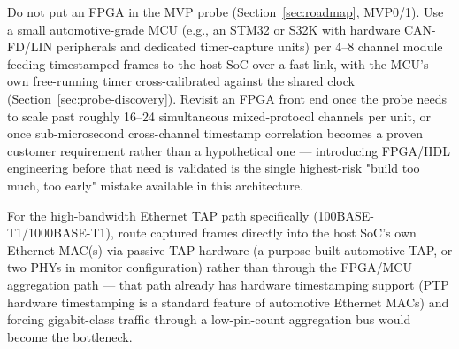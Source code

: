 \begin{decision}[title={FPGA recommendation}]
Do not put an FPGA in the MVP probe (Section~\ref{sec:roadmap}, MVP0/1). Use a small automotive-grade MCU (e.g., an STM32 or S32K with hardware CAN-FD/LIN peripherals and dedicated timer-capture units) per 4--8 channel module feeding timestamped frames to the host SoC over a fast link, with the MCU's own free-running timer cross-calibrated against the shared clock (Section~\ref{sec:probe-discovery}). Revisit an FPGA front end once the probe needs to scale past roughly 16--24 simultaneous mixed-protocol channels per unit, or once sub-microsecond cross-channel timestamp correlation becomes a proven customer requirement rather than a hypothetical one --- introducing FPGA/HDL engineering before that need is validated is the single highest-risk "build too much, too early" mistake available in this architecture.
\end{decision}

For the high-bandwidth Ethernet TAP path specifically (100BASE-T1/1000BASE-T1), route captured frames directly into the host SoC's own Ethernet MAC(s) via passive TAP hardware (a purpose-built automotive TAP, or two PHYs in monitor configuration) rather than through the FPGA/MCU aggregation path --- that path already has hardware timestamping support (PTP hardware timestamping is a standard feature of automotive Ethernet MACs) and forcing gigabit-class traffic through a low-pin-count aggregation bus would become the bottleneck.
